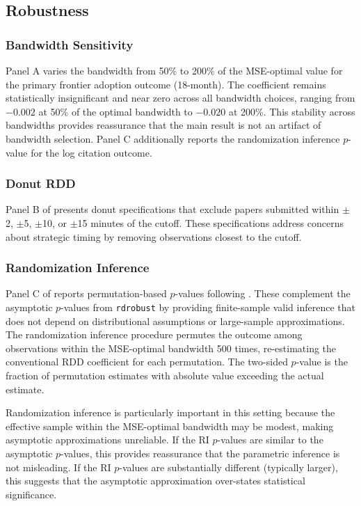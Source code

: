 \documentclass[12pt]{article}
\begin{document}
\subsection{Robustness}

\subsubsection{Bandwidth Sensitivity}

 Panel A varies the bandwidth from 50\% to 200\% of the MSE-optimal value for the primary frontier adoption outcome (18-month). The coefficient remains statistically insignificant and near zero across all bandwidth choices, ranging from $-0.002$ at 50\% of the optimal bandwidth to $-0.020$ at 200\%. This stability across bandwidths provides reassurance that the main result is not an artifact of bandwidth selection. Panel C additionally reports the randomization inference $p$-value for the log citation outcome.

\subsubsection{Donut RDD}

Panel B of  presents donut specifications that exclude papers submitted within $\pm$2, $\pm$5, $\pm$10, or $\pm$15 minutes of the cutoff. These specifications address concerns about strategic timing by removing observations closest to the cutoff.

\subsubsection{Randomization Inference}

Panel C of  reports permutation-based $p$-values following \citet{cattaneo2015}. These complement the asymptotic $p$-values from \texttt{rdrobust} by providing finite-sample valid inference that does not depend on distributional assumptions or large-sample approximations. The randomization inference procedure permutes the outcome among observations within the MSE-optimal bandwidth 500 times, re-estimating the conventional RDD coefficient for each permutation. The two-sided $p$-value is the fraction of permutation estimates with absolute value exceeding the actual estimate.


  


Randomization inference is particularly important in this setting because the effective sample within the MSE-optimal bandwidth may be modest, making asymptotic approximations unreliable. If the RI $p$-values are similar to the asymptotic $p$-values, this provides reassurance that the parametric inference is not misleading. If the RI $p$-values are substantially different (typically larger), this suggests that the asymptotic approximation over-states statistical significance.
\end{document}
